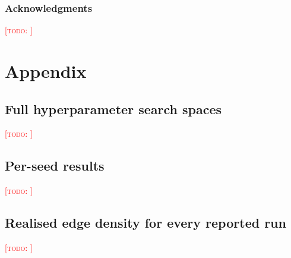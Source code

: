 \documentclass{article} %
\newcommand{\TODO}[1]{\textcolor{red}{[\textsc{todo}: #1]}}
\begin{document}
\subsubsection*{Acknowledgments}
\TODO{}




\appendix
\section{Appendix}

\subsection{Full hyperparameter search spaces}
\TODO{}

\subsection{Per-seed results}
\TODO{}

\subsection{Realised edge density for every reported run}
\TODO{}
\end{document}
